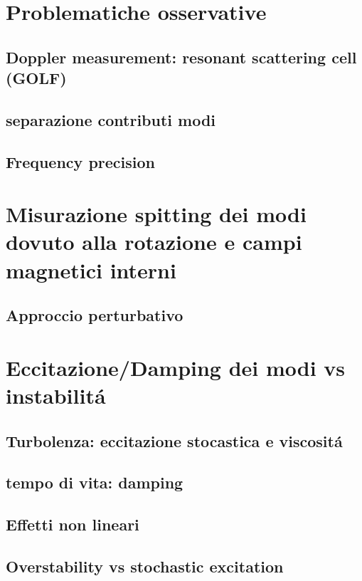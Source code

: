 \documentclass[../main.tex]{subfiles}
\begin{document}
\begin{refsection}
\nocite{*}
\begingroup
\let\clearpage\relax
\printbibliography
\endgroup

\section{Problematiche osservative}

\subsection{Doppler measurement: resonant scattering cell (GOLF)}

\subsection{separazione contributi modi}

\subsection{Frequency precision}

\section{Misurazione spitting dei modi dovuto alla rotazione e campi magnetici interni}

\subsection{Approccio perturbativo}


\section{Eccitazione/Damping dei modi vs instabilit\'a}

\subsection{Turbolenza: eccitazione stocastica e viscosit\'a}

\subsection{tempo di vita: damping}

\subsection{Effetti non lineari}

\subsection{Overstability vs stochastic excitation}

\end{refsection}
\end{document}
